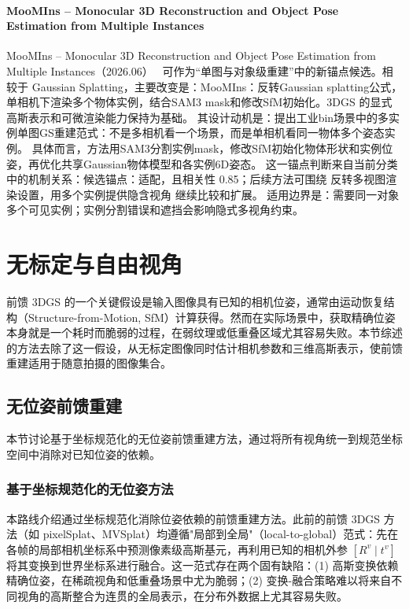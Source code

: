 \paragraph{MooMIns -- Monocular 3D Reconstruction and Object Pose Estimation from Multiple Instances}
MooMIns -- Monocular 3D Reconstruction and Object Pose Estimation from Multiple Instances（2026.06）~\cite{2606_14389} 可作为“单图与对象级重建”中的新锚点候选。相较于 Gaussian Splatting，主要改变是：MooMIns：反转Gaussian splatting公式，单相机下渲染多个物体实例，结合SAM3 mask和修改SfM初始化。3DGS 的显式高斯表示和可微渲染能力保持为基础。
其设计动机是：提出工业bin场景中的多实例单图GS重建范式：不是多相机看一个场景，而是单相机看同一物体多个姿态实例。
具体而言，方法用SAM3分割实例mask，修改SfM初始化物体形状和实例位姿，再优化共享Gaussian物体模型和各实例6D姿态。
这一锚点判断来自当前分类中的机制关系：候选锚点：适配，且相关性 0.85；后续方法可围绕 反转多视图渲染设置，用多个实例提供隐含视角 继续比较和扩展。
适用边界是：需要同一对象多个可见实例；实例分割错误和遮挡会影响隐式多视角约束。
\section{无标定与自由视角}
\label{sec:13_2}

前馈 3DGS 的一个关键假设是输入图像具有已知的相机位姿，通常由运动恢复结构（Structure-from-Motion, SfM）计算获得。然而在实际场景中，获取精确位姿本身就是一个耗时而脆弱的过程，在弱纹理或低重叠区域尤其容易失败。本节综述的方法去除了这一假设，从无标定图像同时估计相机参数和三维高斯表示，使前馈重建适用于随意拍摄的图像集合。

\subsection{无位姿前馈重建}
\label{ss:13_2a}

本节讨论基于坐标规范化的无位姿前馈重建方法，通过将所有视角统一到规范坐标空间中消除对已知位姿的依赖。

\subsubsection{基于坐标规范化的无位姿方法}

本路线介绍通过坐标规范化消除位姿依赖的前馈重建方法。此前的前馈 3DGS 方法（如 pixelSplat、MVSplat）均遵循"局部到全局"（local-to-global）范式：先在各帧的局部相机坐标系中预测像素级高斯基元，再利用已知的相机外参 $[R^v \mid t^v]$ 将其变换到世界坐标系进行融合。这一范式存在两个固有缺陷：(1) 高斯变换依赖精确位姿，在稀疏视角和低重叠场景中尤为脆弱；(2) 变换-融合策略难以将来自不同视角的高斯整合为连贯的全局表示，在分布外数据上尤其容易失败。

